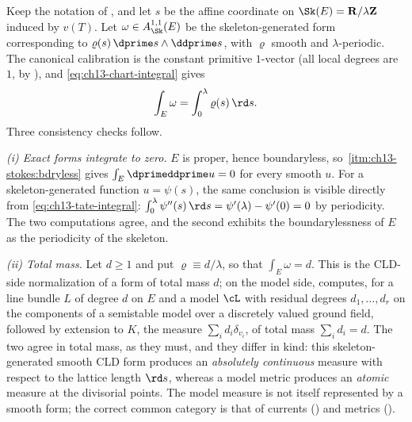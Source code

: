 \begin{example}
\label{ex:ch13-tate-integration}
Keep the notation of , and let $s$ be the affine
coordinate on $\Sk(E)=\mathbf R/\lambda\mathbf Z$ induced by $v(T)$.  Let
$\omega\in A^{1,1}_{\Sk}(E)$ be the skeleton-generated form corresponding to
$\varrho(s)\,\dprime s\wedge\ddprime s$, with $\varrho$ smooth and
$\lambda$-periodic.  The canonical calibration is the constant primitive
$1$-vector (all local degrees are $1$, by
), and \eqref{eq:ch13-chart-integral} gives
\begin{equation}
\label{eq:ch13-tate-integral}
 \int_E\omega=\int_0^\lambda\varrho(s)\,\rd s .
\end{equation}
Three consistency checks follow.

\emph{(i) Exact forms integrate to zero.}  $E$ is proper, hence
boundaryless, so \,\cref{itm:ch13-stokes:bdryless}
gives $\int_E\dprimeddprime u=0$ for every smooth $u$.  For a
skeleton-generated function $u=\psi(s)$, the same conclusion is visible
directly from \eqref{eq:ch13-tate-integral}:
$\int_0^\lambda\psi''(s)\,\rd s=\psi'(\lambda)-\psi'(0)=0$ by periodicity.
The two computations agree, and the second exhibits the boundarylessness of
$E$ as the periodicity of the skeleton.

\emph{(ii) Total mass.}  Let $d\ge1$ and put $\varrho\equiv d/\lambda$, so
that $\int_E\omega=d$.  This is the CLD-side normalization of a form of total
mass $d$; on the model side,  computes, for a line
bundle $L$ of degree $d$ on $E$ and a model $\cL$ with residual degrees
$d_1,\ldots,d_r$ on the components of a semistable model over a
discretely valued ground field, followed by extension to $K$, the measure
$\sum_id_i\delta_{v_i}$, of total mass $\sum_id_i=d$.  The two agree in
total mass, as they must, and they differ in kind: this skeleton-generated
smooth CLD form produces
an \emph{absolutely continuous} measure with respect to the lattice length
$\rd s$, whereas a model metric produces an \emph{atomic} measure at the
divisorial points.  The model measure is not itself represented by a smooth
form; the correct common category is that of currents
() and metrics
().


\end{example}
